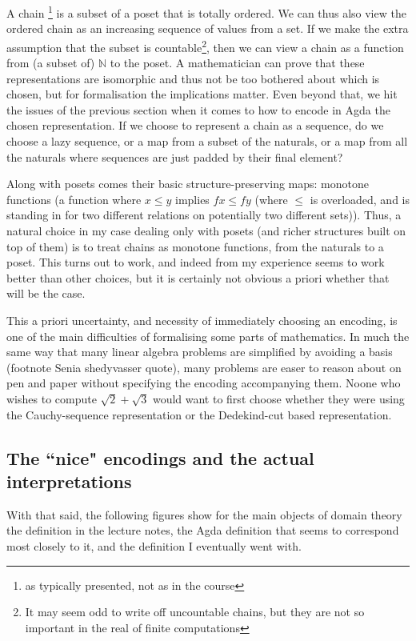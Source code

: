 \documentclass[12pt,a4paper,twoside,openright]{report}
\begin{document}
A chain \footnote{as typically presented, not as in the course} is a subset of a poset that is totally ordered. We can thus also view the ordered chain as an increasing sequence of values from a set. If we make the extra assumption that the subset is countable\footnote{It may seem odd to write off uncountable chains, but they are not so important in the real of finite computations}, then we can view a chain as a function from (a subset of) $\mathbb{N}$ to the poset. A mathematician can prove that these representations are isomorphic and thus not be too bothered about which is chosen, but for formalisation the implications matter. Even beyond that, we hit the issues of the previous section when it comes to how to encode in Agda the chosen representation. If we choose to represent a chain as a sequence, do we choose a lazy sequence, or a map from a subset of the naturals, or a map from all the naturals where sequences are just padded by their final element? 

Along with posets comes their basic structure-preserving maps: monotone functions (a function where $x \leq y$ implies $f x \leq f y$ (where $\leq$ is overloaded, and is standing in for two different relations on potentially two different sets)). Thus, a natural choice in my case dealing only with posets (and richer structures built on top of them) is to treat chains as monotone functions, from the naturals to a poset. This turns out to work, and indeed from my experience seems to work better than other choices, but it is certainly not obvious a priori whether that will be the case.

This a priori uncertainty, and necessity of immediately choosing an encoding, is one of the main difficulties of formalising some parts of mathematics. In much the same way that many linear algebra problems are simplified by avoiding a basis (footnote Senia shedyvasser quote), many problems are easer to reason about on pen and paper without specifying the encoding accompanying them. Noone who wishes to compute $\sqrt{2} + \sqrt{3}$ would want to first choose whether they were using the Cauchy-sequence representation or the Dedekind-cut based representation. 
\subsection{The ``nice" encodings and the actual interpretations}
With that said, the following figures show for the main objects of domain theory the definition in the lecture notes, the Agda definition that seems to correspond most closely to it, and the definition I eventually went with.
\end{document}
